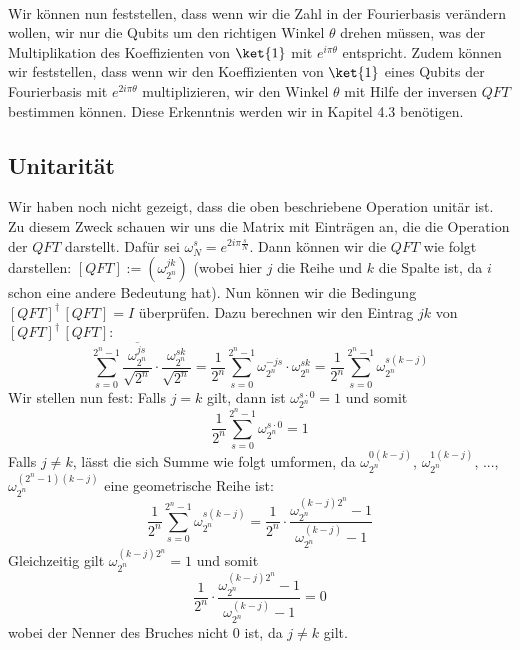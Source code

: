 \paragraph{}

\noindent Wir können nun feststellen, dass wenn wir die Zahl in der Fourierbasis verändern wollen, wir nur die Qubits um den richtigen Winkel $\theta$ drehen müssen, was der Multiplikation des Koeffizienten von $\ket{1}$ mit $e^{i\pi\theta}$ entspricht. Zudem können wir feststellen, dass wenn wir den Koeffizienten von $\ket{1}$ eines Qubits der Fourierbasis mit $e^{2i\pi\theta}$ multiplizieren, wir den Winkel $\theta$ mit Hilfe der inversen $QFT$ bestimmen können. Diese Erkenntnis werden wir in Kapitel 4.3 benötigen.

\subsection{Unitarität}
Wir haben noch nicht gezeigt, dass die oben beschriebene Operation unitär ist. Zu diesem Zweck schauen wir uns die Matrix mit Einträgen an, die die Operation der $QFT$ darstellt. Dafür sei $\omega_N^{s} = e^{2i\pi\frac{s}{N}}$. Dann können wir die $QFT$ wie folgt darstellen: $[QFT] := (\omega_{2^n}^{jk})$ (wobei hier $j$ die Reihe und $k$ die Spalte ist, da $i$ schon eine andere Bedeutung hat). Nun können wir die Bedingung $[QFT]^{\dagger}\, [QFT] = I$ überprüfen. Dazu berechnen wir den Eintrag $jk$ von $[QFT]^{\dagger}\, [QFT]$:
$$\sum_{s = 0}^{2^n - 1}\frac{\overline{\omega_{2^n}^{js}}}{\sqrt{2^n}} \cdot \frac{\omega_{2^n}^{sk}}{\sqrt{2^n}} = \frac{1}{2^n}\sum_{s = 0}^{2^n - 1}\omega_{2^n}^{-js} \cdot \omega_{2^n}^{sk} = \frac{1}{2^n}\sum_{s = 0}^{2^n - 1}\omega_{2^n}^{s(k - j)}$$
Wir stellen nun fest: Falls $j = k$ gilt, dann ist $\omega_{2^n}^{s\cdot 0} = 1$ und somit 
$$\frac{1}{2^n}\sum_{s = 0}^{2^n - 1}\omega_{2^n}^{s\cdot 0} = 1$$
Falls $j \neq k$, lässt die sich Summe wie folgt umformen, da $\omega_{2^n}^{0(k - j)}$, $\omega_{2^n}^{1(k - j)}$, ..., $\omega_{2^n}^{(2^n - 1)(k - j)}$ eine geometrische Reihe ist:
$$\frac{1}{2^n}\sum_{s = 0}^{2^n - 1}\omega_{2^n}^{s(k - j)} = \frac{1}{2^n} \cdot \frac{\omega_{2^n}^{(k - j)2^n} - 1}{\omega_{2^n}^{(k - j)} - 1}$$
Gleichzeitig gilt $\omega_{2^n}^{(k - j)2^n} = 1$ und somit 
$$\frac{1}{2^n} \cdot \frac{\omega_{2^n}^{(k - j)2^n} - 1}{\omega_{2^n}^{(k - j)} - 1} = 0$$
wobei der Nenner des Bruches nicht $0$ ist, da $j \neq k$ gilt.

\paragraph{}

